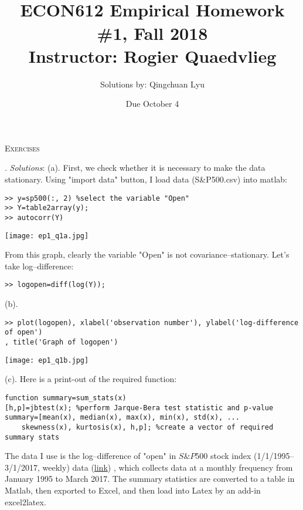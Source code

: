 \documentclass[11pt]{article}
\begin{document}

\title{\mbox{}\\[-8ex]ECON612 Empirical Homework \#1, Fall 2018\\\normalsize
	Instructor: Rogier Quaedvlieg\\[-2.5ex]}
\author{Solutions by: Qingchuan Lyu\\[1ex]}
\date{Due October 4 }

\maketitle



\noindent
\textsc{Exercises}

. \textit{Solutions}: (a). First, we check whether it is necessary to make the data stationary. Using "import data" button, I load data (S\&P500.csv) into matlab:

\begin{lstlisting}
>> y=sp500(:, 2) %select the variable "Open"
>> Y=table2array(y);
>> autocorr(Y)
\end{lstlisting}
\texttt{[image: ep1\_q1a.jpg]}

From this graph, clearly the variable "Open" is not covariance--stationary. Let's take log--difference:

\begin{lstlisting}
>> logopen=diff(log(Y));
\end{lstlisting}

(b). \begin{lstlisting}
>> plot(logopen), xlabel('observation number'), ylabel('log-difference of open')
, title('Graph of logopen')
\end{lstlisting}
\texttt{[image: ep1\_q1b.jpg]}

(c). Here is a print-out of the required function:

\begin{lstlisting}
function summary=sum_stats(x)
[h,p]=jbtest(x); %perform Jarque-Bera test statistic and p-value
summary=[mean(x), median(x), max(x), min(x), std(x), ...
    skewness(x), kurtosis(x), h,p]; %create a vector of required summary stats
\end{lstlisting}

The data I use is the log--difference of "open" in $S\&P 500$ stock index (1/1/1995--3/1/2017, weekly) data (\href{https://finance.yahoo.com/quote/\%5EGSPC/history?period1=788947200&period2=1489820400&interval=1mo&filter=history&frequency=1mo}{link})
, which collects data at a monthly frequency from January 1995 to March 2017. The summary statistics are converted to a table in Matlab, then exported to Excel, and then load into Latex by an add-in excel2latex.
\end{document}
